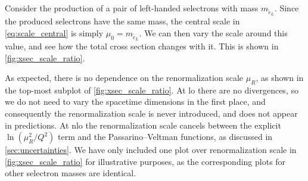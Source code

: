 Consider the production of a pair of left-handed selectrons with mass $m_{\tilde{e}_L}$. Since the produced selectrons have the same mass, the central scale in \cref{eq:scale_central} is simply $\mu_0 = m_{\tilde{e}_L}$.
We can then vary the scale around this value, and see how the total cross section changes with it. This is shown in \cref{fig:xsec_scale_ratio}.

As expected, there is no dependence on the renormalization scale $\mu_R$, as shown in the top-most subplot of \cref{fig:xsec_scale_ratio}.
At \gls{lo} there are no divergences, so we do not need to vary the spacetime dimensions in the first place, and consequently the renormalization scale is never introduced, and does not appear in predictions.
At \gls{nlo} the renormalization scale cancels between the explicit $\ln(\mu_R^2/Q^2)$ term and the Passarino--Veltman functions, as discussed in \cref{sec:uncertainties}.
We have only included one plot over renormalization scale in \cref{fig:xsec_scale_ratio} for illustrative purposes, as the corresponding plots for other selectron masses are identical.


